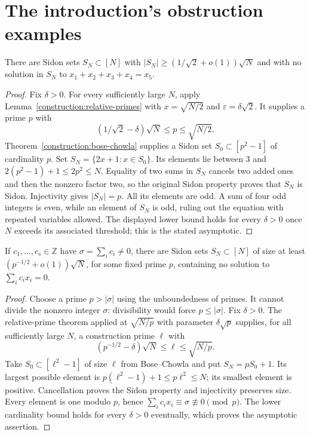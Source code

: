 \section{The introduction's obstruction examples}

\begin{proposition}
\label{app:odd-obstruction}
\leanok
There are Sidon sets $S_N\subset[N]$ with
$|S_N|\geq(1/\sqrt2+o(1))\sqrt N$ and with no solution in $S_N$ to
$x_1+x_2+x_3+x_4=x_5$.
\end{proposition}
\begin{proof}
Fix $\delta>0$. For every sufficiently large $N$, apply
Lemma~\ref{construction:relative-primes} with $x=\sqrt{N/2}$ and
$\varepsilon=\delta\sqrt2$. It supplies a prime $p$ with
\[
 (1/\sqrt2-\delta)\sqrt N\le p\le\sqrt{N/2}.
\]
Theorem~\ref{construction:bose-chowla} supplies a Sidon set
$S_0\subset[p^2-1]$ of cardinality $p$.
Set $S_N=\{2x+1:x\in S_0\}$. Its elements lie between $3$ and
$2(p^2-1)+1\le2p^2\le N$.
Equality of two sums in $S_N$ cancels two added ones and then the
nonzero factor two, so the original Sidon property proves that $S_N$
is Sidon. Injectivity gives $|S_N|=p$.
All its elements are odd. A sum of four odd integers is even, while
an element of $S_N$ is odd, ruling out the equation with repeated
variables allowed. The displayed lower bound holds for every $\delta>0$
once $N$ exceeds its associated threshold; this is the stated asymptotic.
\end{proof}

\begin{proposition}
\label{app:nonzero-sum-obstruction}
\leanok
If $c_1,\ldots,c_s\in\mathbb Z$ have $\sigma=\sum_ic_i\ne0$, there are
Sidon sets $S_N\subset[N]$ of size at least
$(p^{-1/2}+o(1))\sqrt N$, for some fixed prime $p$, containing no solution
to $\sum_ic_ix_i=0$.
\end{proposition}
\begin{proof}
Choose a prime $p>|\sigma|$ using the unboundedness of primes.
It cannot divide the nonzero integer $\sigma$: divisibility would force
$p\le|\sigma|$.
Fix $\delta>0$. The relative-prime theorem applied at $\sqrt{N/p}$
with parameter $\delta\sqrt p$ supplies, for all sufficiently large $N$,
a construction prime $\ell$ with
\[
 (p^{-1/2}-\delta)\sqrt N\le\ell\le\sqrt{N/p}.
\]
Take $S_0\subset[\ell^2-1]$ of size $\ell$ from Bose--Chowla and put
$S_N=pS_0+1$. Its largest possible element is
$p(\ell^2-1)+1\le p\ell^2\le N$; its smallest element is positive.
Cancellation proves the Sidon property and injectivity preserves size.
Every element is one modulo $p$, hence
$\sum_i c_ix_i\equiv\sigma\not\equiv0\pmod p$.
The lower cardinality bound holds for every $\delta>0$ eventually,
which proves the asymptotic assertion.
\end{proof}
